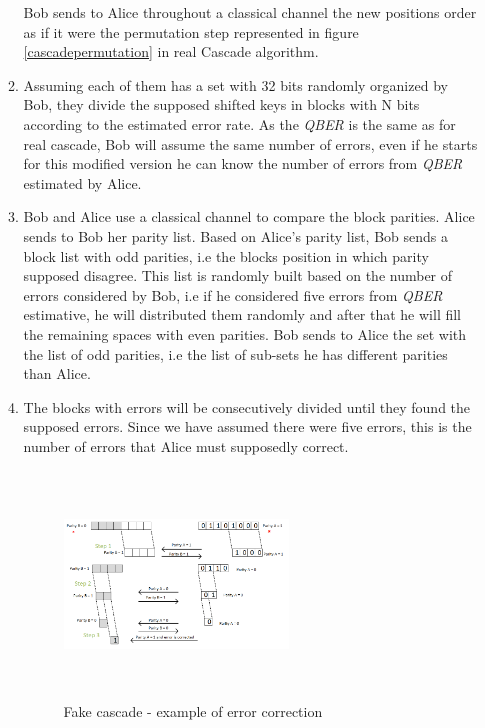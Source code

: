 \begin{enumerate}
\begin{enumerate}
            Bob sends to Alice throughout a classical channel the new positions order as if it were the permutation step represented in figure \ref{cascadepermutation} in real Cascade algorithm.

        \item Assuming each of them has a set with 32 bits randomly organized by Bob, they divide the supposed shifted keys in blocks with N bits according to the estimated error rate. As the \textit{QBER} is the same as for real cascade, Bob will assume the same number of errors, even if he starts for this modified version he can know the number of errors from \textit{QBER} estimated by Alice.

        \item Bob and Alice use a classical channel to compare the block parities. Alice sends to Bob her parity list. Based on Alice's parity list, Bob sends a block list with odd parities, i.e the blocks position in which parity supposed disagree. This list is randomly built based on the number of errors considered by Bob, i.e if he considered five errors from \textit{QBER} estimative, he will distributed them randomly and after that he will fill the remaining spaces with even parities. Bob sends to Alice the set with the list of odd parities, i.e the list of sub-sets he has different parities than Alice.

        \item The blocks with errors will be consecutively divided until they found the supposed errors. Since we have assumed there were five errors, this is the number of errors that Alice must supposedly correct.

            \begin{figure}[h]
            	\centering
            	\includegraphics[width=0.6\textwidth, height=6cm]{./sdf/qokd_with_discrete_variables/figures/fake_cascade.png}
                	\caption{Fake cascade - example of error correction}\label{fake cascade}
            \end{figure}


\end{enumerate}
\end{enumerate}
